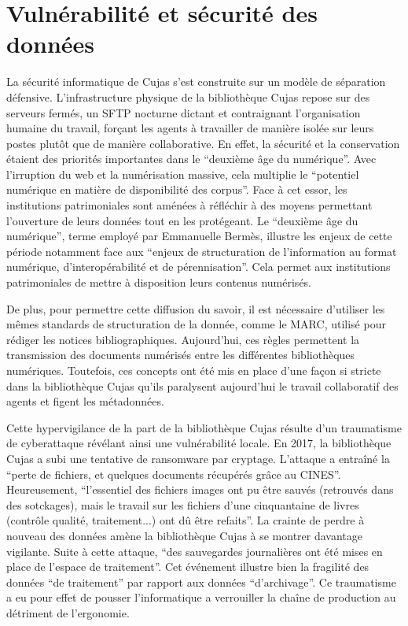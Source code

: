 \section{Vulnérabilité et sécurité des données}
La sécurité informatique de Cujas s'est construite sur un modèle de séparation défensive. L'infrastructure physique de la bibliothèque Cujas repose sur des serveurs fermés, un SFTP nocturne dictant et contraignant l'organisation humaine du travail, forçant les agents à travailler de manière isolée sur leurs postes plutôt que de manière collaborative. En effet, la sécurité et la conservation étaient des priorités importantes dans le \enquote{deuxième âge du numérique}. Avec l'irruption du web et la numérisation massive, cela multiplie le \enquote{potentiel numérique en matière de disponibilité des corpus}. Face à cet essor, les institutions patrimoniales sont aménées à réfléchir à des moyens permettant l'ouverture de leurs données tout en les protégeant. Le \enquote{deuxième âge du numérique}, terme employé par Emmanuelle Bermès, illustre les enjeux de cette période notamment face aux \enquote{enjeux de structuration de l'information au format numérique, d'interopérabilité et de pérennisation}. Cela permet aux institutions patrimoniales de mettre à disposition leurs contenus numérisés.

De plus, pour permettre cette diffusion du savoir, il est nécessaire d'utiliser les mêmes standards de structuration de la donnée, comme le MARC, utilisé pour rédiger les notices bibliographiques. Aujourd'hui, ces règles permettent la transmission des documents numérisés entre les différentes bibliothèques numériques. Toutefois, ces concepts ont été mis en place d'une façon si stricte dans la bibliothèque Cujas qu'ils paralysent aujourd'hui le travail collaboratif des agents et figent les métadonnées. 

Cette hypervigilance de la part de la bibliothèque Cujas résulte d'un traumatisme de cyberattaque révélant ainsi une vulnérabilité locale. En 2017, la bibliothèque Cujas a subi une tentative de ransomware par cryptage. L'attaque a entraîné la \enquote{perte de fichiers, et quelques documents récupérés grâce au CINES}. Heureusement, \enquote{l'essentiel des fichiers images ont pu être sauvés (retrouvés dans des sotckages), mais le travail sur les fichiers d'une cinquantaine de livres (contrôle qualité, traitement...) ont dû être refaits}. La crainte de perdre à nouveau des données amène la bibliothèque Cujas à se montrer davantage vigilante. Suite à cette attaque, \enquote{des sauvegardes journalières ont été mises en place de l'espace de traitement}. Cet événement illustre bien la fragilité des données \enquote{de traitement} par rapport aux données \enquote{d'archivage}. Ce traumatisme a eu pour effet de pousser l'informatique a verrouiller la chaîne de production au détriment de l'ergonomie. 

